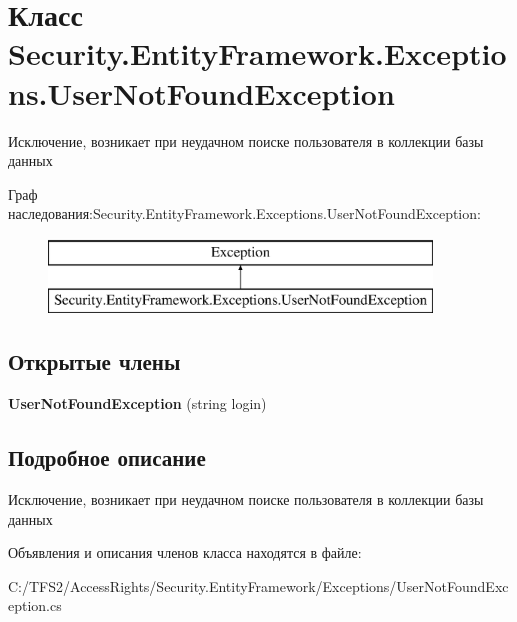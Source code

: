 \hypertarget{class_security_1_1_entity_framework_1_1_exceptions_1_1_user_not_found_exception}{}\section{Класс Security.\+Entity\+Framework.\+Exceptions.\+User\+Not\+Found\+Exception}
\label{class_security_1_1_entity_framework_1_1_exceptions_1_1_user_not_found_exception}


Исключение, возникает при неудачном поиске пользователя в коллекции базы данных  


Граф наследования\+:Security.\+Entity\+Framework.\+Exceptions.\+User\+Not\+Found\+Exception\+:\begin{figure}[H]
\begin{center}
\leavevmode
\includegraphics[height=2.000000cm]{d8/d01/class_security_1_1_entity_framework_1_1_exceptions_1_1_user_not_found_exception}
\end{center}
\end{figure}
\subsection*{Открытые члены}
\begin{DoxyCompactItemize}
\item 
\mbox{\label{class_security_1_1_entity_framework_1_1_exceptions_1_1_user_not_found_exception_acbe74ac3bbade87bd08a8bc5fc4200df}} 
{\bfseries User\+Not\+Found\+Exception} (string login)
\end{DoxyCompactItemize}


\subsection{Подробное описание}
Исключение, возникает при неудачном поиске пользователя в коллекции базы данных 



Объявления и описания членов класса находятся в файле\+:\begin{DoxyCompactItemize}
\item 
C\+:/\+T\+F\+S2/\+Access\+Rights/\+Security.\+Entity\+Framework/\+Exceptions/User\+Not\+Found\+Exception.\+cs\end{DoxyCompactItemize}
